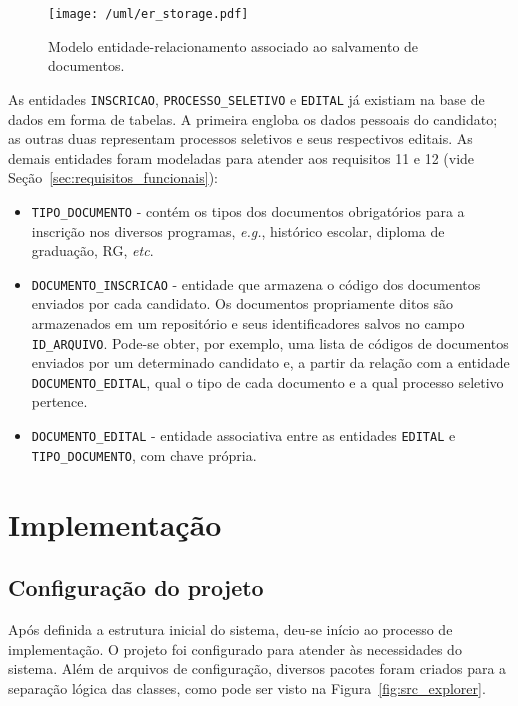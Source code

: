 \documentclass[
  10.5pt,				  %
	openright,			%
	twoside,			  %
  a5paper,
  chapter=TITLE,	%
	section=TITLE,	%
  hyphens,        %
	english,        %
	brazil          %
]{abntex2}
\begin{document}
\begin{figure}[!ht]
  \caption{\label{fig:uml_storage} Modelo entidade-relacionamento associado ao salvamento de documentos. }
  \begin{center}
    \texttt{[image: /uml/er\_storage.pdf]}
  \end{center}
\end{figure}

As entidades \texttt{INSCRICAO}, \texttt{PROCESSO\_SELETIVO} e \texttt{EDITAL} já existiam na base de dados em forma de tabelas. A primeira engloba os dados pessoais do candidato; as outras duas representam processos seletivos e seus respectivos editais. As demais entidades foram modeladas para atender aos requisitos 11 e 12 (vide Seção~\ref{sec:requisitos_funcionais}):

\begin{itemize}
  \item \texttt{TIPO\_DOCUMENTO} - contém os tipos dos documentos obrigatórios para a inscrição nos diversos programas, \emph{e.g.}, histórico escolar, diploma de graduação, RG, \emph{etc}.
  \item \texttt{DOCUMENTO\_INSCRICAO} - entidade que armazena o código dos documentos enviados por cada candidato. Os documentos propriamente ditos são armazenados em um repositório e seus identificadores salvos no campo \texttt{ID\_ARQUIVO}. Pode-se obter, por exemplo, uma lista de códigos de documentos enviados por um determinado candidato e, a partir da relação com a entidade \texttt{DOCUMENTO\_EDITAL}, qual o tipo de cada documento e a qual processo seletivo pertence.
  \item \texttt{DOCUMENTO\_EDITAL} - entidade associativa entre as entidades \texttt{EDITAL} e \texttt{TIPO\_DOCUMENTO}, com chave própria.
\end{itemize}

\chapter{Implementação}

\section{Configuração do projeto}\label{sec:config}

Após definida a estrutura inicial do sistema, deu-se início ao processo de implementação. O projeto foi configurado para atender às necessidades do sistema. Além de arquivos de configuração, diversos pacotes foram criados para a separação lógica das classes, como pode ser visto na Figura~\ref{fig:src_explorer}.
\end{document}
